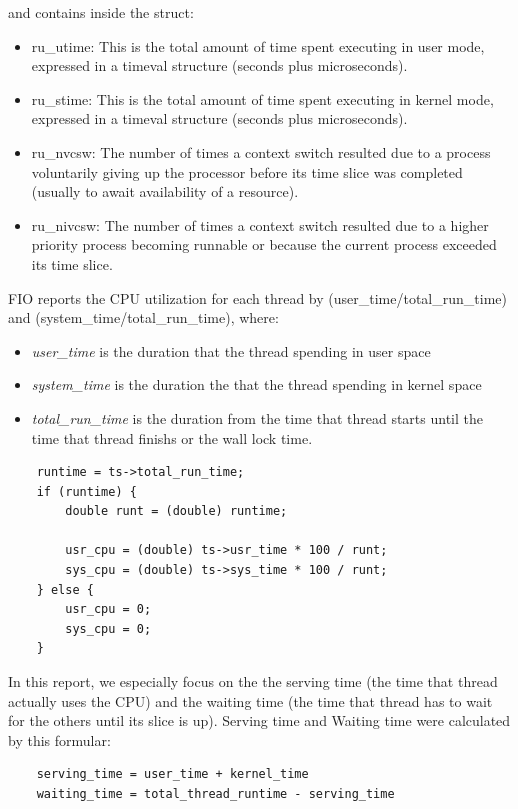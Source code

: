 \documentclass{acmsig}
\begin{document}
and contains inside the struct:

\begin{itemize}
  \item ru\_utime: This is the total amount of time spent executing in user mode, expressed in a timeval structure (seconds plus microseconds).
  \item ru\_stime: This is the total amount of time spent executing in kernel mode, expressed in a timeval structure (seconds plus microseconds).
  \item ru\_nvcsw: The number of times a context switch resulted due to a process voluntarily giving up the processor before its time slice was completed (usually to await availability of a resource).
  \item ru\_nivcsw: The number of times a context switch resulted due to a higher priority process becoming runnable or because the current process exceeded its time slice.
\end{itemize}

FIO reports the CPU utilization for each thread by (user\_time/total\_run\_time) and (system\_time/total\_run\_time), where:

\begin{itemize}
  \item \textit{user\_time} is the duration that the thread spending in user space
  \item \textit{system\_time} is the duration the that the thread spending in kernel space
  \item \textit{total\_run\_time} is the duration from the time that thread starts until the time that thread finishs or the wall lock time.
\end{itemize}

\begin{lstlisting}
    runtime = ts->total_run_time;
    if (runtime) {
        double runt = (double) runtime;

        usr_cpu = (double) ts->usr_time * 100 / runt;
        sys_cpu = (double) ts->sys_time * 100 / runt;
    } else {
        usr_cpu = 0;
        sys_cpu = 0;
    }
\end{lstlisting}
In this report, we especially focus on the the serving time (the time that thread actually uses the CPU) and the waiting time (the time that thread has to wait for the others until its slice is up). Serving time and Waiting time were calculated by this formular:
\begin{lstlisting}
    serving_time = user_time + kernel_time
    waiting_time = total_thread_runtime - serving_time
\end{lstlisting}
\end{document}
